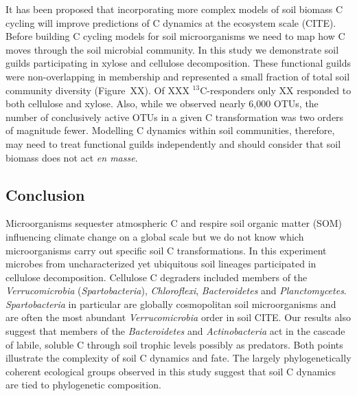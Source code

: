 It has been proposed that incorporating more complex models of soil biomass
C cycling will improve predictions of C dynamics at the ecosystem scale (CITE).
Before building C cycling models for soil microorganisms we need to map how
C moves through the soil microbial community. In this study we demonstrate soil
guilds participating in xylose and cellulose decomposition. These
functional guilds were non-overlapping in membership and represented a small
fraction of total soil community diversity (Figure~XX). Of XXX
$^{13}$C-responders only XX responded to both cellulose and xylose. Also, while
we observed nearly 6,000 OTUs, the number of conclusively active OTUs in
a given C transformation was two orders of magnitude fewer. Modelling
C dynamics within soil communities, therefore, may need to treat functional
guilds independently and should consider that soil biomass does not act
\textit{en masse}.

\subsection{Conclusion} 
Microorganisms sequester atmospheric C and respire soil organic
matter (SOM) influencing climate change on a global scale but we do not
know which microorganisms carry out specific soil C transformations. In
this experiment microbes from uncharacterized yet ubiquitous soil lineages
participated in cellulose decomposition. Cellulose C degraders included
members of the \textit{Verrucomicrobia} (\textit{Spartobacteria}),
\textit{Chloroflexi}, \textit{Bacteroidetes} and \textit{Planctomycetes}.
\textit{Spartobacteria} in particular are globally cosmopolitan soil
microorganisms and are often the most abundant \textit{Verrucomicrobia}
order in soil CITE. Our results also suggest that members of the
\textit{Bacteroidetes} and \textit{Actinobacteria} act in the cascade of
labile, soluble C through soil trophic levels possibly as predators. Both
points illustrate the complexity of soil C dynamics and fate. The largely
phylogenetically coherent ecological groups observed in this study suggest that
soil C dynamics are tied to phylogenetic composition.
